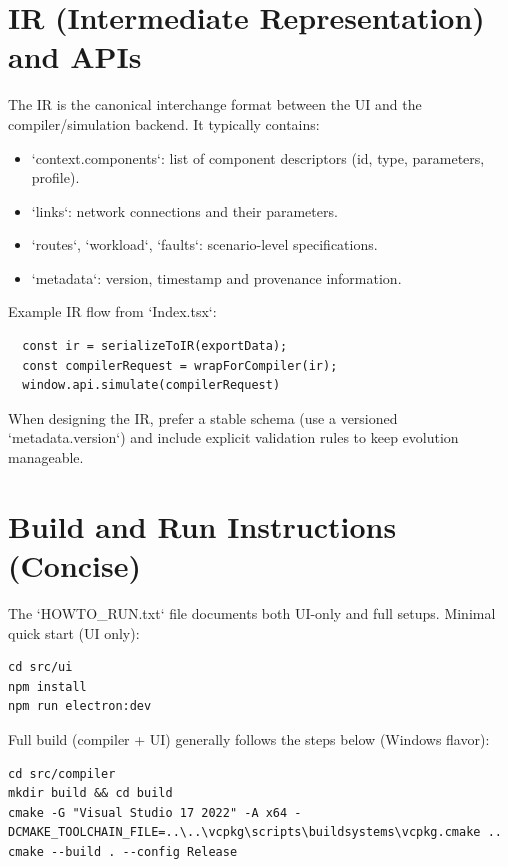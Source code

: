 \documentclass[11pt,a4paper]{article}
\begin{document}
\newpage

\section{IR (Intermediate Representation) and APIs}

The IR is the canonical interchange format between the UI and the compiler/simulation backend. It typically contains:

\begin{itemize}
  \item `context.components`: list of component descriptors (id, type, parameters, profile).
  \item `links`: network connections and their parameters.
  \item `routes`, `workload`, `faults`: scenario-level specifications.
  \item `metadata`: version, timestamp and provenance information.
\end{itemize}

Example IR flow from `Index.tsx`:
\begin{verbatim}
  const ir = serializeToIR(exportData);
  const compilerRequest = wrapForCompiler(ir);
  window.api.simulate(compilerRequest)
\end{verbatim}

When designing the IR, prefer a stable schema (use a versioned `metadata.version`) and include explicit validation rules to keep evolution manageable.

\section{Build and Run Instructions (Concise)}

The `HOWTO_RUN.txt` file documents both UI-only and full setups. Minimal quick start (UI only):

\begin{verbatim}
cd src/ui
npm install
npm run electron:dev
\end{verbatim}

Full build (compiler + UI) generally follows the steps below (Windows flavor):

\begin{verbatim}
cd src/compiler
mkdir build && cd build
cmake -G "Visual Studio 17 2022" -A x64 -DCMAKE_TOOLCHAIN_FILE=..\..\vcpkg\scripts\buildsystems\vcpkg.cmake ..
cmake --build . --config Release
\end{verbatim}
\end{document}
